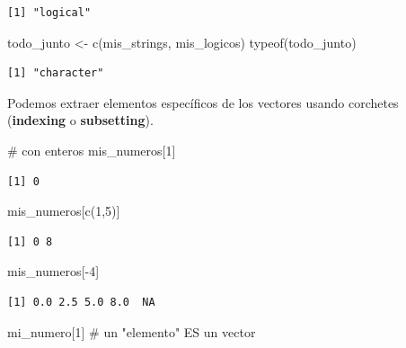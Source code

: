 \documentclass[
  letterpaper,
  DIV=11,
  numbers=noendperiod]{scrartcl}
\newenvironment{Shaded}{\begin{snugshade}}{\end{snugshade}}
\newcommand{\CommentTok}[1]{\textcolor[rgb]{0.37,0.37,0.37}{#1}}
\newcommand{\DecValTok}[1]{\textcolor[rgb]{0.68,0.00,0.00}{#1}}
\newcommand{\FunctionTok}[1]{\textcolor[rgb]{0.28,0.35,0.67}{#1}}
\newcommand{\NormalTok}[1]{\textcolor[rgb]{0.00,0.23,0.31}{#1}}
\newcommand{\OtherTok}[1]{\textcolor[rgb]{0.00,0.23,0.31}{#1}}
\newcommand{\SpecialCharTok}[1]{\textcolor[rgb]{0.37,0.37,0.37}{#1}}
\begin{document}
\begin{verbatim}
[1] "logical"
\end{verbatim}

\begin{Shaded}
\begin{Highlighting}[]
\NormalTok{todo\_junto }\OtherTok{\textless{}{-}} \FunctionTok{c}\NormalTok{(mis\_strings, mis\_logicos) }
\FunctionTok{typeof}\NormalTok{(todo\_junto) }
\end{Highlighting}
\end{Shaded}

\begin{verbatim}
[1] "character"
\end{verbatim}

Podemos extraer elementos específicos de los vectores usando corchetes
(\textbf{indexing} o \textbf{subsetting}).

\begin{Shaded}
\begin{Highlighting}[]
\CommentTok{\# con enteros }
\NormalTok{mis\_numeros[}\DecValTok{1}\NormalTok{] }
\end{Highlighting}
\end{Shaded}

\begin{verbatim}
[1] 0
\end{verbatim}

\begin{Shaded}
\begin{Highlighting}[]
\NormalTok{mis\_numeros[}\FunctionTok{c}\NormalTok{(}\DecValTok{1}\NormalTok{,}\DecValTok{5}\NormalTok{)] }
\end{Highlighting}
\end{Shaded}

\begin{verbatim}
[1] 0 8
\end{verbatim}

\begin{Shaded}
\begin{Highlighting}[]
\NormalTok{mis\_numeros[}\SpecialCharTok{{-}}\DecValTok{4}\NormalTok{]}
\end{Highlighting}
\end{Shaded}

\begin{verbatim}
[1] 0.0 2.5 5.0 8.0  NA
\end{verbatim}

\begin{Shaded}
\begin{Highlighting}[]
\NormalTok{mi\_numero[}\DecValTok{1}\NormalTok{] }\CommentTok{\# un "elemento" ES un vector  }
\end{Highlighting}
\end{Shaded}
\end{document}
